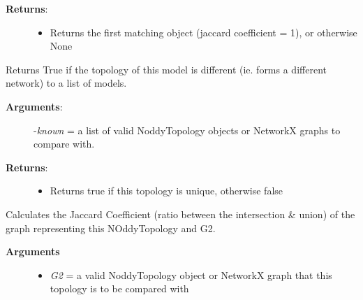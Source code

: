 \documentclass[a4paper,10pt,english]{sphinxmanual}
\begin{document}
\begin{fulllineitems}
\begin{fulllineitems}
\begin{description}
\item[{\textbf{Returns}:}] \leavevmode\begin{itemize}
\item {} 
Returns the first matching object (jaccard coefficient = 1), or otherwise None

\end{itemize}

\end{description}

\end{fulllineitems}


\begin{fulllineitems}
\label{pynoddy:pynoddy.output.NoddyTopology.is_unique}
Returns True if the topology of this model is different (ie. forms a different network) to a list of models.
\begin{description}
\item[{\textbf{Arguments}:}] \leavevmode
-\emph{known} = a list of valid NoddyTopology objects or NetworkX graphs to compare with.

\item[{\textbf{Returns}:}] \leavevmode\begin{itemize}
\item {} 
Returns true if this topology is unique, otherwise false

\end{itemize}

\end{description}

\end{fulllineitems}


\begin{fulllineitems}
\label{pynoddy:pynoddy.output.NoddyTopology.jaccard_coefficient}
Calculates the Jaccard Coefficient (ratio between the intersection \& union) of the graph representing this NOddyTopology and G2.
\begin{description}
\item[{\textbf{Arguments}}] \leavevmode\begin{itemize}
\item {} 
\emph{G2} = a valid NoddyTopology object or NetworkX graph that this topology is to be compared with


\end{itemize}
\end{description}
\end{fulllineitems}
\end{fulllineitems}
\end{document}
